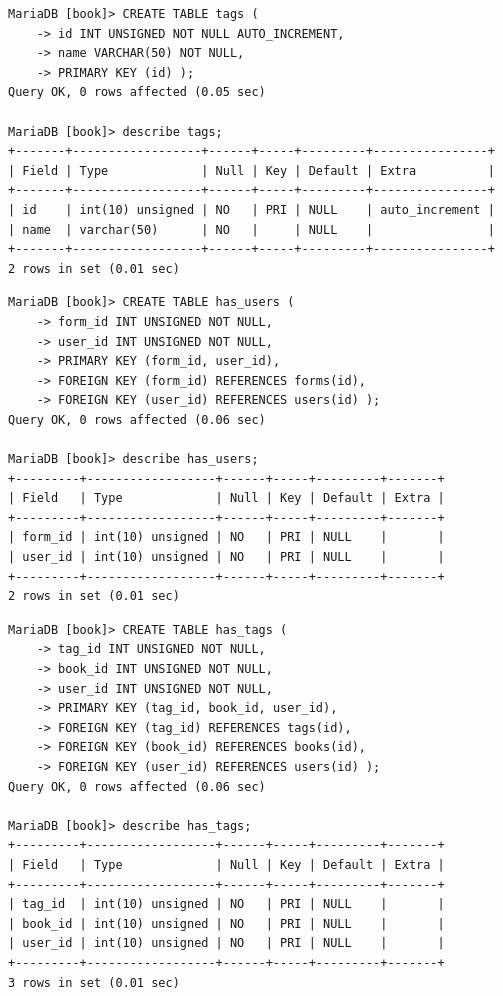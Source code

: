 \documentclass{assignment}
\begin{document}
\begin{verbatim}
MariaDB [book]> CREATE TABLE tags ( 
    -> id INT UNSIGNED NOT NULL AUTO_INCREMENT, 
    -> name VARCHAR(50) NOT NULL, 
    -> PRIMARY KEY (id) );
Query OK, 0 rows affected (0.05 sec)

MariaDB [book]> describe tags;
+-------+------------------+------+-----+---------+----------------+
| Field | Type             | Null | Key | Default | Extra          |
+-------+------------------+------+-----+---------+----------------+
| id    | int(10) unsigned | NO   | PRI | NULL    | auto_increment |
| name  | varchar(50)      | NO   |     | NULL    |                |
+-------+------------------+------+-----+---------+----------------+
2 rows in set (0.01 sec)

\end{verbatim}

\begin{verbatim}
MariaDB [book]> CREATE TABLE has_users ( 
    -> form_id INT UNSIGNED NOT NULL, 
    -> user_id INT UNSIGNED NOT NULL, 
    -> PRIMARY KEY (form_id, user_id), 
    -> FOREIGN KEY (form_id) REFERENCES forms(id), 
    -> FOREIGN KEY (user_id) REFERENCES users(id) );
Query OK, 0 rows affected (0.06 sec)

MariaDB [book]> describe has_users;
+---------+------------------+------+-----+---------+-------+
| Field   | Type             | Null | Key | Default | Extra |
+---------+------------------+------+-----+---------+-------+
| form_id | int(10) unsigned | NO   | PRI | NULL    |       |
| user_id | int(10) unsigned | NO   | PRI | NULL    |       |
+---------+------------------+------+-----+---------+-------+
2 rows in set (0.01 sec)
\end{verbatim}

\begin{verbatim}
MariaDB [book]> CREATE TABLE has_tags ( 
    -> tag_id INT UNSIGNED NOT NULL, 
    -> book_id INT UNSIGNED NOT NULL, 
    -> user_id INT UNSIGNED NOT NULL, 
    -> PRIMARY KEY (tag_id, book_id, user_id), 
    -> FOREIGN KEY (tag_id) REFERENCES tags(id), 
    -> FOREIGN KEY (book_id) REFERENCES books(id), 
    -> FOREIGN KEY (user_id) REFERENCES users(id) );
Query OK, 0 rows affected (0.06 sec)

MariaDB [book]> describe has_tags;
+---------+------------------+------+-----+---------+-------+
| Field   | Type             | Null | Key | Default | Extra |
+---------+------------------+------+-----+---------+-------+
| tag_id  | int(10) unsigned | NO   | PRI | NULL    |       |
| book_id | int(10) unsigned | NO   | PRI | NULL    |       |
| user_id | int(10) unsigned | NO   | PRI | NULL    |       |
+---------+------------------+------+-----+---------+-------+
3 rows in set (0.01 sec)
\end{verbatim}
\end{document}
